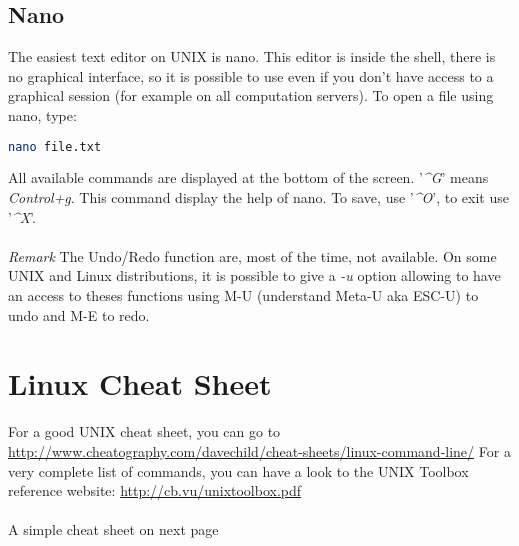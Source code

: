 \documentclass[two_sides]{my_article}
\begin{document}
\subsection{Nano}
The easiest text editor on UNIX is nano. This editor is inside the shell, there is no graphical interface, so it is possible to use even if you don't have access to a graphical session (for example on all computation servers). To open a file using nano, type:

\begin{lstlisting}[frame=lines, numbers=none, language=bash]
nano file.txt
\end{lstlisting}

All available commands are displayed at the bottom of the screen. '\emph{\textasciicircum G}' means \emph{Control+g}. This command display the help of nano. To save, use '\emph{\textasciicircum O}', to exit use '\emph{\textasciicircum X}'. 

\paragraph{}
\emph{Remark}
The Undo/Redo function are, most of the time, not available. On some UNIX and Linux distributions, it is possible to give a \emph{-u} option allowing to have an access to theses functions using M-U (understand Meta-U aka ESC-U) to undo and M-E to redo.

\section{Linux Cheat Sheet}
For a good UNIX cheat sheet, you can go to \url{http://www.cheatography.com/davechild/cheat-sheets/linux-command-line/}
For a very complete list of commands, you can have a look to the UNIX Toolbox reference website: \url{http://cb.vu/unixtoolbox.pdf}

\paragraph{}
A simple cheat sheet on next page

\end{document}
